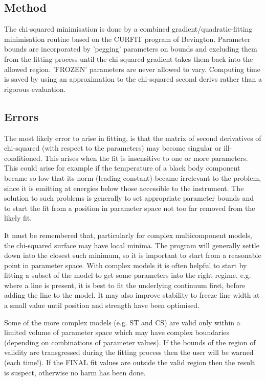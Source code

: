 \documentclass{book}
\renewcommand{\_}{{\tt\char'137}}     %
\begin{document}
\subsection{Method}
The chi-squared minimisation is done by a combined
gradient/quadratic-fitting minimisation routine based on the
CURFIT program of Bevington. Parameter bounds are incorporated by
'pegging' parameters on bounds and excluding them from the
fitting process until the chi-squared gradient takes them back
into the allowed region. 'FROZEN' parameters are never allowed to
vary. Computing time is saved by using an approximation to the
chi-squared second derivs rather than a rigorous evaluation.

\subsection{Errors}
The most likely error to arise in fitting, is that the matrix of
second derivatives of chi-squared (with respect to the
parameters) may become singular or ill-conditioned. This arises
when the fit is insensitive to one or more parameters. This could
arise for example if the temperature of a black body component
became so low that its norm (leading constant) became irrelevant
to the problem, since it is emitting at energies below those
accessible to the instrument. The solution to such problems is
generally to set appropriate parameter bounds and to start the
fit from a position in parameter space not too far removed from
the likely fit.

It must be remembered that, particularly for complex
multicomponent models, the chi-squared surface may have local
minima. The program will generally settle down into the closest
such minimum, so it is important to start from a reasonable point
in parameter space. With complex models it is often helpful to
start by fitting a subset of the model to get some parameters
into the right regime. e.g. where a line is present, it is best
to fit the underlying continuum first, before adding the line to
the model. It may also improve stability to freeze line width at
a small value until position and strength have been optimised.

Some of the more complex models (e.g. ST and CS) are valid only
within a limited volume of parameter space which may have complex
boundaries (depending on combinations of parameter values). If
the bounds of the region of validity are transgressed during the
fitting process then the user will be warned (each time!). If the
FINAL fit values are outside the valid region then the result is
suspect, otherwise no harm has been done.
\end{document}
